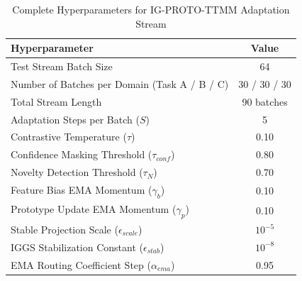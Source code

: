 \documentclass{article}
\theoremstyle{plain}
\theoremstyle{definition}
\theoremstyle{remark}
\begin{document}
\begin{table}[ht]
\caption{Complete Hyperparameters for IG-PROTO-TTMM Adaptation Stream}
\label{tab:hyperparams}
\vskip 0.15in
\begin{center}
\begin{small}
\begin{tabular}{lc}
\toprule
Hyperparameter & Value \\
\midrule
Test Stream Batch Size & 64 \\
Number of Batches per Domain (Task A / B / C) & 30 / 30 / 30 \\
Total Stream Length & 90 batches \\
Adaptation Steps per Batch ($S$) & 5 \\
Contrastive Temperature ($\tau$) & 0.10 \\
Confidence Masking Threshold ($\tau_{conf}$) & 0.80 \\
Novelty Detection Threshold ($\tau_N$) & 0.70 \\
Feature Bias EMA Momentum ($\gamma_b$) & 0.10 \\
Prototype Update EMA Momentum ($\gamma_p$) & 0.10 \\
Stable Projection Scale ($\epsilon_{scale}$) & $10^{-5}$ \\
IGGS Stabilization Constant ($\epsilon_{stab}$) & $10^{-8}$ \\
EMA Routing Coefficient Step ($\alpha_{ema}$) & 0.95 \\
\bottomrule
\end{tabular}
\end{small}
\end{center}
\vskip -0.1in
\end{table}
\end{document}
